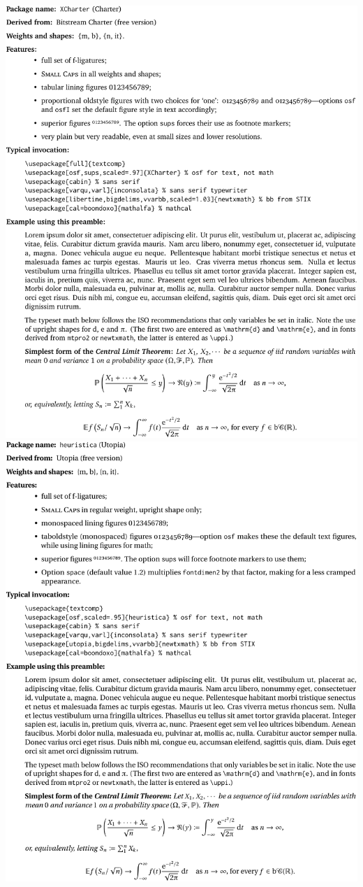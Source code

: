 \documentclass{article}
\begin{document}
\newpage
\hypertarget{lnk:xcharter}{}
\includegraphics{xchsamp-crop} 
\newpage
\hypertarget{lnk:heuristica}{}
\includegraphics{heusamp-crop}
\end{document}
